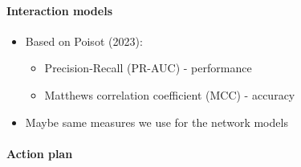 \documentclass[
]{agujournal2019}
\let\oldparagraph\paragraph
\renewcommand{\paragraph}[1]{\oldparagraph{#1}\mbox{}}
\providecommand{\tightlist}{%
  \setlength{\itemsep}{0pt}\setlength{\parskip}{0pt}}\usepackage{longtable,booktabs,array}
\begin{document}
\paragraph{Interaction models}\label{interaction-models}

\begin{itemize}
\tightlist
\item
  Based on Poisot (2023):

  \begin{itemize}
  \tightlist
  \item
    Precision-Recall (PR-AUC) - performance
  \item
    Matthews correlation coefficient (MCC) - accuracy
  \end{itemize}
\item
  Maybe same measures we use for the network models
\end{itemize}

\paragraph{Action plan}\label{action-plan}
\end{document}
